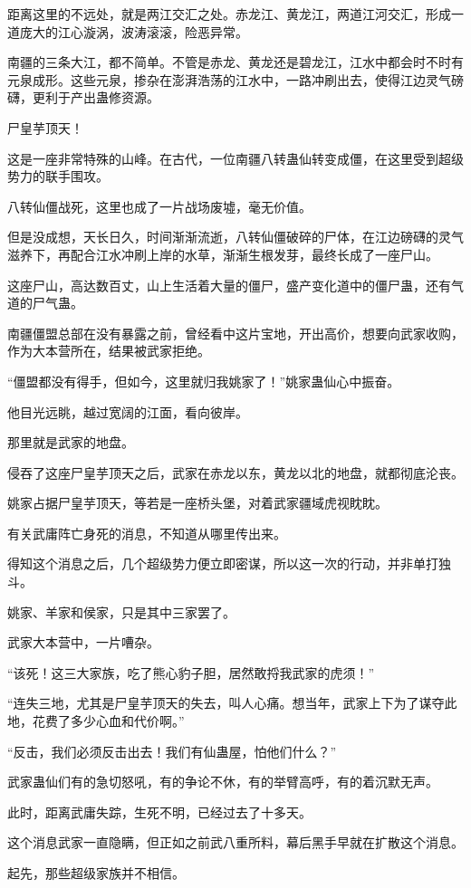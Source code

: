 \begin{this_body}
距离这里的不远处，就是两江交汇之处。赤龙江、黄龙江，两道江河交汇，形成一道庞大的江心漩涡，波涛滚滚，险恶异常。

南疆的三条大江，都不简单。不管是赤龙、黄龙还是碧龙江，江水中都会时不时有元泉成形。这些元泉，掺杂在澎湃浩荡的江水中，一路冲刷出去，使得江边灵气磅礴，更利于产出蛊修资源。

尸皇芋顶天！

这是一座非常特殊的山峰。在古代，一位南疆八转蛊仙转变成僵，在这里受到超级势力的联手围攻。

八转仙僵战死，这里也成了一片战场废墟，毫无价值。

但是没成想，天长日久，时间渐渐流逝，八转仙僵破碎的尸体，在江边磅礴的灵气滋养下，再配合江水冲刷上岸的水草，渐渐生根发芽，最终长成了一座尸山。

这座尸山，高达数百丈，山上生活着大量的僵尸，盛产变化道中的僵尸蛊，还有气道的尸气蛊。

南疆僵盟总部在没有暴露之前，曾经看中这片宝地，开出高价，想要向武家收购，作为大本营所在，结果被武家拒绝。

“僵盟都没有得手，但如今，这里就归我姚家了！”姚家蛊仙心中振奋。

他目光远眺，越过宽阔的江面，看向彼岸。

那里就是武家的地盘。

侵吞了这座尸皇芋顶天之后，武家在赤龙以东，黄龙以北的地盘，就都彻底沦丧。

姚家占据尸皇芋顶天，等若是一座桥头堡，对着武家疆域虎视眈眈。

有关武庸阵亡身死的消息，不知道从哪里传出来。

得知这个消息之后，几个超级势力便立即密谋，所以这一次的行动，并非单打独斗。

姚家、羊家和侯家，只是其中三家罢了。

武家大本营中，一片嘈杂。

“该死！这三大家族，吃了熊心豹子胆，居然敢捋我武家的虎须！”

“连失三地，尤其是尸皇芋顶天的失去，叫人心痛。想当年，武家上下为了谋夺此地，花费了多少心血和代价啊。”

“反击，我们必须反击出去！我们有仙蛊屋，怕他们什么？”

武家蛊仙们有的急切怒吼，有的争论不休，有的举臂高呼，有的着沉默无声。

此时，距离武庸失踪，生死不明，已经过去了十多天。

这个消息武家一直隐瞒，但正如之前武八重所料，幕后黑手早就在扩散这个消息。

起先，那些超级家族并不相信。


\end{this_body}
